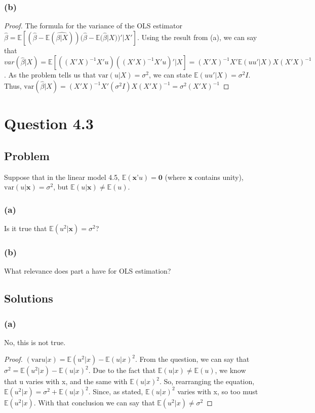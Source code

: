 \documentclass[10pt, a4paper]{article}
\newcommand{\EE}{\mathbb E}
\newcommand{\var}{\text{var}}
\begin{document}
      \subsubsection*{(b)}
        \begin{proof}
          The formula for the variance of the OLS estimator $\hat{\beta} = \EE[(\hat{\beta} - \EE(\hat{\beta|X}))(\hat{\beta}-\EE(\hat{\beta}|X))'|X']$. Using the result from (a), we can say that $var(\hat{\beta}|X) = \EE[((X'X)^{-1}X'u)((X'X)^{-1}X'u)'|X] = (X'X)^{-1}X'\EE(uu'|X)X(X'X)^{-1}$. As the problem tells us that $\var(u|X) = \sigma^2$, we can state $\EE(uu'|X) = \sigma^2I$. Thus, $\var(\hat{\beta}|X) = (X'X)^{-1}X'(\sigma^2I)X(X'X)^{-1} = \sigma^2(X'X)^{-1}$
        \end{proof}
\section*{Question 4.3}
  \subsection*{Problem}
    Suppose that in the linear model 4.5, $\EE(\textbf{x'}u)=\textbf{0}$ (where $\textbf{x}$ contains unity), $\var(u|\textbf{x})=\sigma^2$, but $\EE(u|\textbf{x})\ne\EE(u)$. 
    \subsubsection*{(a)}
      Is it true that $\EE(u^2|\textbf{x}) = \sigma^2$?
    \subsubsection*{(b)}
      What relevance does part a have for OLS estimation?
  \subsection*{Solutions}
    \subsubsection*{(a)}
      No, this is not true. 
      \begin{proof}
        $(\var{u|x}) = \EE(u^2|x) - \EE(u|x)^2$. From the question, we can say that $\sigma^2 = \EE(u^2|x) - \EE(u|x)^2$. Due to the fact that $\EE(u|x)\ne\EE(u)$, we know that u varies with x, and the same with $\EE(u|x)^2$. So, rearranging the equation, $\EE(u^2|x) = \sigma^2 + \EE(u|x)^2$. Since, as stated, $\EE(u|x)^2$ varies with x, so too must $\EE(u^2|x)$. With that conclusion we can say that $\EE(u^2|x)\ne\sigma^2$ 
      \end{proof}
\end{document}
